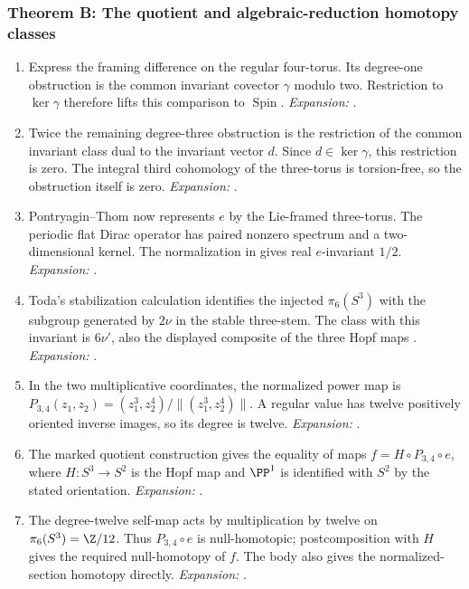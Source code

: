 \subsubsection*{Theorem B: The quotient and algebraic-reduction homotopy classes}
\begin{enumerate}[label=\arabic*.,leftmargin=*]
\item\hypertarget{step-III-B-1}{} Express the framing difference on the regular four-torus.
Its degree-one obstruction is the common invariant covector $\gamma$
modulo two.  Restriction to $\ker\gamma$ therefore lifts this
comparison to $\operatorname{Spin}$.
\textit{Expansion:} .
\item\hypertarget{step-III-B-2}{} Twice the remaining degree-three obstruction is the restriction
of the common invariant class dual to the invariant vector $d$.
Since $d\in\ker\gamma$, this restriction is zero.  The integral
third cohomology of the three-torus is torsion-free, so the obstruction
itself is zero.
\textit{Expansion:} .
\item\hypertarget{step-III-B-3}{} Pontryagin--Thom now represents $e$ by the Lie-framed
three-torus.  The periodic flat Dirac operator has paired nonzero
spectrum and a two-dimensional kernel.  The normalization in
\cite[Theorem~4.14, p.~423]{mapsAPS2} gives real $e$-invariant $1/2$.
\textit{Expansion:} .
\item\hypertarget{step-III-B-4}{} Toda's stabilization calculation identifies the injected
$\pi_6(S^3)$ with the subgroup generated by $2\nu$ in the stable
three-stem.  The class with this invariant is $6\nu'$, also the
displayed composite of the three Hopf maps
\cite[Theorem~4.1 and Corollaries~4.2--4.3]{mapsToda52}.
\textit{Expansion:} .
\item\hypertarget{step-III-B-5}{} In the two multiplicative coordinates, the normalized power map
is $P_{3,4}(z_1,z_2)=(z_1^3,z_2^4)/\|(z_1^3,z_2^4)\|$.
A regular value has twelve positively oriented inverse images, so its
degree is twelve.
\textit{Expansion:} .
\item\hypertarget{step-III-B-6}{} The marked quotient construction gives the equality of maps
$f=H\circ P_{3,4}\circ e$, where $H:S^3\to S^2$ is the Hopf
map and $\PP^1$ is identified with $S^2$ by the stated orientation.
\textit{Expansion:} .
\item\hypertarget{step-III-B-7}{} The degree-twelve self-map acts by multiplication by twelve on
$\pi_6(S^3)=\Z/12$.  Thus $P_{3,4}\circ e$ is null-homotopic;
postcomposition with $H$ gives the required null-homotopy of $f$.
The body also gives the normalized-section homotopy directly.
\textit{Expansion:} .
\end{enumerate}


